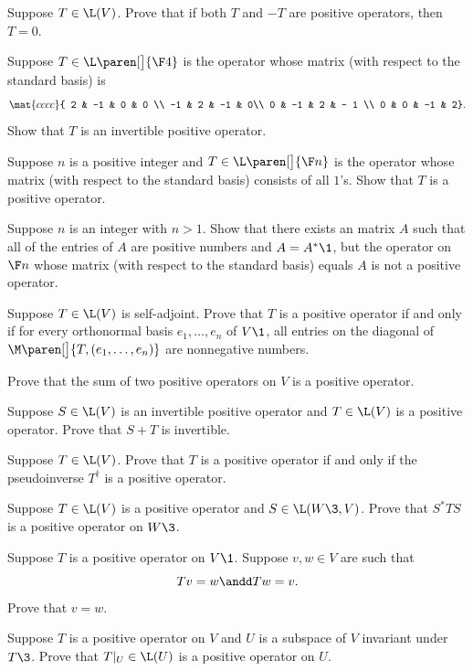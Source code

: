 
\exercise
Suppose $T \in \L(V)$. Prove that if both $T$ and $-T$ are positive operators, then $T = 0$.


\exercise
Suppose $T \in \L\paren[\big]{\F4}$ is the operator whose matrix (with respect to the standard basis) is
\[
\mat{cccc}{
2 & -1 & 0 & 0 \\
-1 & 2 & -1 & 0\\
0 & -1 & 2 & - 1 \\
0 & 0 & -1 & 2}.
\]
Show that $T$ is an invertible positive operator.


\exercise
Suppose $n$ is a positive integer and $T \in \L\paren[\big]{\F n}$ is the operator whose matrix (with respect to the standard basis) consists of all $1$'s. Show that $T$ is a positive operator.


\exercise
Suppose $n$ is an integer with $n > 1$. Show that there exists an  matrix $A$ such that all of the entries of $A$ are positive numbers and $A = A^*\1$, but the operator on $\F n$ whose matrix (with respect to the standard basis) equals $A$ is not a positive operator.


\exercise
Suppose $T \in \L(V)$ is self-adjoint. Prove that $T$ is a positive operator if and only if for every orthonormal basis $e_1, \ldots, e_n$ of $V\1$, all entries on the diagonal of $\M\paren[\big]{ T, (e_1, \ldots, e_n) }$ are nonnegative numbers.


\exercise
Prove that the sum of two positive operators on $V$ is a positive operator.


\exercise
Suppose $S \in \L(V)$ is an invertible positive operator and $T \in \L(V)$ is a positive operator. Prove that $S+T$ is invertible.


\exercise
Suppose $T \in \L(V)$. Prove that $T$ is a positive operator if and only if the pseudoinverse $T^\dagger$ is a positive operator.


\exercise
Suppose $T \in \L(V)$ is a positive operator and $S \in \L(W\3, V)$. Prove that $S^* T S$ is a positive operator on $W\3$.


\exercise
Suppose $T$ is a positive operator on $V\1$. Suppose $v, w \in V$ are such that
\[
Tv = w \andd Tw = v.
\]
Prove that $v = w$.


\exercise
Suppose $T$ is a positive operator on $V$ and $U$ is a subspace of $V$ invariant under $T\3$. Prove that $T|_U \in \L(U)$ is a positive operator on $U$.


